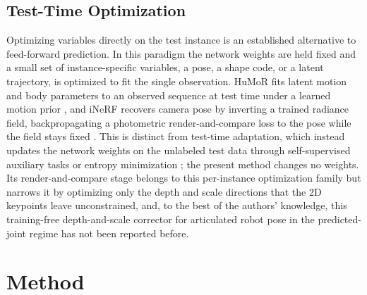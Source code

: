 \subsection{Test-Time Optimization}
Optimizing variables directly on the test instance is an established alternative to feed-forward prediction. In this paradigm the network weights are held fixed and a small set of instance-specific variables, a pose, a shape code, or a latent trajectory, is optimized to fit the single observation. HuMoR fits latent motion and body parameters to an observed sequence at test time under a learned motion prior \cite{rempe2021humor}, and iNeRF recovers camera pose by inverting a trained radiance field, backpropagating a photometric render-and-compare loss to the pose while the field stays fixed \cite{yeninerf}. This is distinct from test-time adaptation, which instead updates the network weights on the unlabeled test data through self-supervised auxiliary tasks or entropy minimization \cite{sun2020test,wang2020tent,liang2025comprehensive}; the present method changes no weights. Its render-and-compare stage belongs to this per-instance optimization family but narrows it by optimizing only the depth and scale directions that the 2D keypoints leave unconstrained, and, to the best of the authors' knowledge, this training-free depth-and-scale corrector for articulated robot pose in the predicted-joint regime has not been reported before.



\section{Method}
\label{sec:method}

